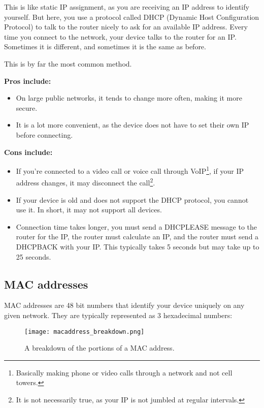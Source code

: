 \documentclass[../main.tex]{subfiles}
\begin{document}

This is like static IP assignment, as you are receiving an IP address to identify yourself. But here, you use a protocol called DHCP (Dynamic Host Configuration Protocol) to talk to the router nicely to ask for an available IP address. Every time you connect to the network, your device talks to the router for an IP. Sometimes it is different, and sometimes it is the same as before.

This is by far the most common method.

\textbf{Pros include:}
\begin{itemize}
    \item On large public networks, it tends to change more often, making it more secure.
    \item It is a lot more convenient, as the device does not have to set their own IP before connecting.
\end{itemize}

\textbf{Cons include:}
\begin{itemize}
    \item If you're connected to a video call or voice call through VoIP\footnote{Basically making phone or video calls through a network and not cell towers.}, if your IP address changes, it may disconnect the call\footnote{It is not necessarily true, as your IP is not jumbled at regular intervals.}.
    \item If your device is old and does not support the DHCP protocol, you cannot use it. In short, it may not support all devices.
    \item Connection time takes longer, you must send a {\ccmono DHCPLEASE} message to the router for the IP, the router must calculate an IP, and the router must send a {\ccmono DHCPBACK} with your IP. This typically takes 5 seconds but may take up to 25 seconds.
\end{itemize}

\subsection{MAC addresses}

MAC addresses are 48 bit numbers that identify your device uniquely on any given network. They are typically represented as 3 hexadecimal numbers:

\begin{figure}[h]
    \centering
    \texttt{[image: macaddress\_breakdown.png]}
    \caption{A breakdown of the portions of a MAC address.}
    \label{fig:macaddress_breakdown}
\end{figure}
\end{document}
